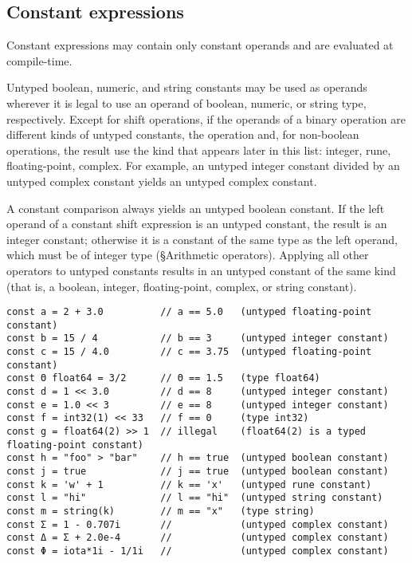 \subsection*{Constant expressions}

Constant expressions may contain only constant
operands and are evaluated at compile-time.

Untyped boolean, numeric, and string constants may be used as operands
wherever it is legal to use an operand of boolean, numeric, or string
type, respectively. Except for shift operations, if the operands of a
binary operation are different kinds of untyped constants, the operation
and, for non-boolean operations, the result use the kind that appears
later in this list: integer, rune, floating-point, complex. For example,
an untyped integer constant divided by an untyped complex constant
yields an untyped complex constant.

A constant comparison always yields an
untyped boolean constant. If the left operand of a constant
shift expression is an untyped constant, the
result is an integer constant; otherwise it is a constant of the same
type as the left operand, which must be of integer type
(§Arithmetic operators). Applying all
other operators to untyped constants results in an untyped constant of
the same kind (that is, a boolean, integer, floating-point, complex, or
string constant).

\begin{Verbatim}[frame=single]
const a = 2 + 3.0          // a == 5.0   (untyped floating-point constant)
const b = 15 / 4           // b == 3     (untyped integer constant)
const c = 15 / 4.0         // c == 3.75  (untyped floating-point constant)
const Θ float64 = 3/2      // Θ == 1.5   (type float64)
const d = 1 << 3.0         // d == 8     (untyped integer constant)
const e = 1.0 << 3         // e == 8     (untyped integer constant)
const f = int32(1) << 33   // f == 0     (type int32)
const g = float64(2) >> 1  // illegal    (float64(2) is a typed floating-point constant)
const h = "foo" > "bar"    // h == true  (untyped boolean constant)
const j = true             // j == true  (untyped boolean constant)
const k = 'w' + 1          // k == 'x'   (untyped rune constant)
const l = "hi"             // l == "hi"  (untyped string constant)
const m = string(k)        // m == "x"   (type string)
const Σ = 1 - 0.707i       //            (untyped complex constant)
const Δ = Σ + 2.0e-4       //            (untyped complex constant)
const Φ = iota*1i - 1/1i   //            (untyped complex constant)
\end{Verbatim}

